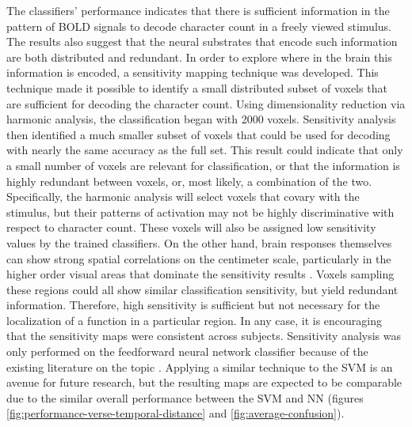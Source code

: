 \documentclass[5p,authoryear]{elsarticle}
\begin{document}
The classifiers' performance indicates that there is sufficient information in the pattern of BOLD signals to decode character count in a freely viewed stimulus. 
The results also suggest that the neural substrates that encode such information are both distributed and redundant.
In order to explore where in the brain this information is encoded, a sensitivity mapping technique was developed.
This technique made it possible to identify a small distributed subset of voxels that are sufficient for decoding the character count.
Using dimensionality reduction via harmonic analysis, the classification began with 2000 voxels.
Sensitivity analysis then identified a much smaller subset of voxels that could be used for decoding with nearly the same accuracy as the full set.
This result could indicate that only a small number of voxels are relevant for classification, or that the information is highly redundant between voxels, or, most likely, a combination of the two.
Specifically, the harmonic analysis will select voxels that covary with the stimulus, but their patterns of activation may not be highly discriminative with respect to character count.
These voxels will also be assigned low sensitivity values by the trained classifiers.
On the other hand, brain responses themselves can show strong spatial correlations on the centimeter scale, particularly in the higher order visual areas that dominate the sensitivity results \citep{Engel1997}. 
Voxels sampling these regions could all show similar classification sensitivity, but yield redundant information.
Therefore, high sensitivity is sufficient but not necessary for the localization of a function in a particular region.
In any case, it is encouraging that the sensitivity maps were consistent across subjects.
Sensitivity analysis was only performed on the feedforward neural network classifier because of the existing literature on the topic \citep{Zurada1994}.
Applying a similar technique to the SVM is an avenue for future research, but the resulting maps are expected to be comparable due to the similar overall performance between the SVM and NN (figures \ref{fig:performance-verse-temporal-distance} and \ref{fig:average-confusion}).
\end{document}

